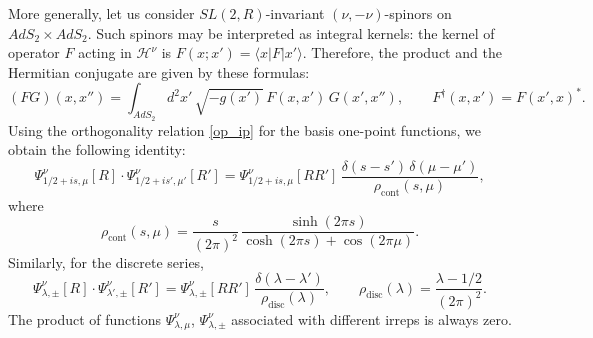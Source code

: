 \documentclass[12pt]{article}
\newcommand*{\bra}[1]{\langle{#1}|}
\newcommand*{\ket}[1]{|{#1}\rangle}
\newcommand{\calH}{\mathcal{H}}
\newcommand{\RR}{\mathbb{R}}
\DeclareMathOperator{\SL}{SL}
\DeclareMathOperator{\AdS}{AdS}
\newcommand{\rcont}{\rho_{\text{cont}}}
\newcommand{\rdisc}{\rho_{\text{disc}}}
\def\widetilde#1{#1}%
\def\AdS{AdS}
\def\SL{SL}
\def\RR{R}
\begin{document}
More generally, let us consider $\widetilde{\SL}(2,\RR)$-invariant $(\nu,-\nu)$-spinors on $\widetilde{\AdS}_2\times\widetilde{\AdS}_2$. Such spinors may be interpreted as integral kernels: the kernel of operator $F$ acting in $\calH^{\nu}$ is $F(x;x')=\bra{x}F\ket{x'}$. Therefore, the product and the Hermitian conjugate are given by these formulas:
\begin{equation}
(FG)(x,x'')
=\int_{\widetilde{\AdS}_2}d^{2}x'\,\sqrt{-g(x')}\,F(x,x')\,G(x',x''),\qquad
F^{\dag}(x,x')=F(x',x)^{*}.
\end{equation}
Using the orthogonality relation \eqref{op_ip} for the basis one-point functions, we obtain the following identity:
\begin{equation} \label{cwfnorm}
\Psi^{\nu}_{1/2+is,\mu}[R]
\cdot \Psi^{\nu}_{1/2+is',\mu'}[R']
=\Psi^{\nu}_{1/2+is,\mu}[RR']\,
\frac{\delta(s-s')\,\delta(\mu-\mu')}{\rcont(s,\mu)},
\end{equation}
where
\begin{equation} \label{rhoc}
\rcont(s,\mu)=\frac{s}{(2\pi)^{2}}\,
\frac{\sinh(2\pi s)}{\cosh(2\pi s)+\cos(2\pi\mu)}.
\end{equation}
Similarly, for the discrete series,
\begin{equation} \label{dwfnorm}
\Psi^{\nu}_{\lambda,\pm}[R]
\cdot\Psi^{\nu}_{\lambda',\pm}[R']
=\Psi^{\nu}_{\lambda,\pm}[RR']\,
\frac{\delta(\lambda-\lambda')}{\rdisc(\lambda)},\qquad
\rdisc(\lambda)=\frac{\lambda-1/2}{(2\pi)^{2}}.
\end{equation}
The product of functions $\Psi^{\nu}_{\lambda,\mu}$, $\Psi^{\nu}_{\lambda,\pm}$ associated with different irreps is always zero.
\end{document}
